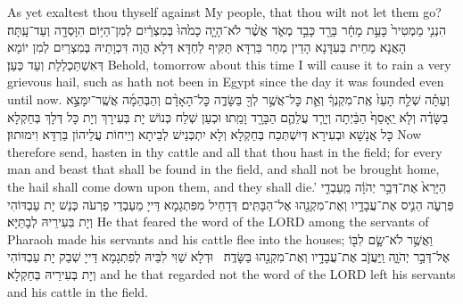 {{As yet exaltest thou thyself against My people, that thou wilt not let them go?}{}
{הִנְנִ֤י מַמְטִיר֙ כָּעֵ֣ת מָחָ֔ר בָּרָ֖ד כָּבֵ֣ד מְאֹ֑ד אֲשֶׁ֨ר לֹא־הָיָ֤ה כָמֹ֙הוּ֙ בְּמִצְרַ֔יִם לְמִן־הַיּ֥וֹם הִוָּסְדָ֖ה וְעַד־עָֽתָּה׃
}
{הָאֲנָא מַחֵית בְּעִדָּנָא הָדֵין מְחַר בַּרְדָּא תַּקִּיף לַחְדָּא דְּלָא הֲוָה דִּכְוָתֵיהּ בְּמִצְרַיִם לְמִן יוֹמָא דְּאִשְׁתַּכְלַלַת וְעַד כְּעַן׃}
{Behold, tomorrow about this time I will cause it to rain a very grievous hail, such as hath not been in Egypt since the day it was founded even until now.}{}
{וְעַתָּ֗ה שְׁלַ֤ח הָעֵז֙ אֶֽת־מִקְנְךָ֔ וְאֵ֛ת כׇּל־אֲשֶׁ֥ר לְךָ֖ בַּשָּׂדֶ֑ה כׇּל־הָאָדָ֨ם וְהַבְּהֵמָ֜ה אֲשֶֽׁר־יִמָּצֵ֣א בַשָּׂדֶ֗ה וְלֹ֤א יֵֽאָסֵף֙ הַבַּ֔יְתָה וְיָרַ֧ד עֲלֵהֶ֛ם הַבָּרָ֖ד וָמֵֽתוּ׃
}
{וּכְעַן שְׁלַח כְּנוֹשׁ יָת בְּעִירָךְ וְיָת כָּל דְּלָךְ בְּחַקְלָא כָּל אֲנָשָׁא וּבְעִירָא דְּיִשְׁתְּכַח בְּחַקְלָא וְלָא יִתְכְּנֵישׁ לְבֵיתָא וְיֵיחוֹת עֲלֵיהוֹן בַּרְדָּא וִימוּתוּן׃}
{Now therefore send, hasten in thy cattle and all that thou hast in the field; for every man and beast that shall be found in the field, and shall not be brought home, the hail shall come down upon them, and they shall die.’}{}
{הַיָּרֵא֙ אֶת־דְּבַ֣ר יְהֹוָ֔ה מֵֽעַבְדֵ֖י פַּרְעֹ֑ה הֵנִ֛יס אֶת־עֲבָדָ֥יו וְאֶת־מִקְנֵ֖הוּ אֶל־הַבָּתִּֽים׃
}
{דְּדָחֵיל מִפִּתְגָמָא דַּייָ מֵעַבְדֵי פַרְעֹה כְּנַשׁ יָת עַבְדּוֹהִי וְיָת בִּעִירֵיהּ לְבָתַּיָּא׃}
{He that feared the word of the LORD among the servants of Pharaoh made his servants and his cattle flee into the houses;}{}
{וַאֲשֶׁ֥ר לֹא־שָׂ֛ם לִבּ֖וֹ אֶל־דְּבַ֣ר יְהֹוָ֑ה וַֽיַּעֲזֹ֛ב אֶת־עֲבָדָ֥יו וְאֶת־מִקְנֵ֖הוּ בַּשָּׂדֶֽה׃ \petucha }
{וּדְלָא שַׁוִּי לִבֵּיהּ לְפִתְגָמָא דַּייָ שְׁבַק יָת עַבְדּוֹהִי וְיָת בְּעִירֵיהּ בְּחַקְלָא׃}
{and he that regarded not the word of the LORD left his servants and his cattle in the field.}{}
}
